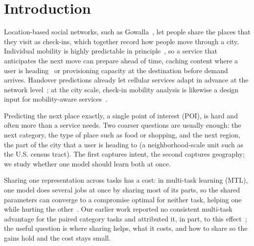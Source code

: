 \section{Introduction}
\label{sec:intro}

Location-based social networks, such as Gowalla~\cite{cho2011gowalla}, let people share the places that they visit as check-ins, which together record how people move through a city. Individual mobility is highly predictable in principle~\cite{song2010limits}, so a service that anticipates the next move can prepare ahead of time, caching content where a user is heading~\cite{bastug2014edge} or provisioning capacity at the destination before demand arrives. Handover predictions already let cellular services adapt in advance at the network level~\cite{vielhaus2022handover}; at the city scale, check-in mobility analysis is likewise a design input for mobility-aware services~\cite{moura2025mobilityaware}.

Predicting the next place exactly, a single point of interest (POI), is hard and often more than a service needs. Two coarser questions are usually enough: the next category, the type of place such as food or shopping, and the next region, the part of the city that a user is heading to (a neighborhood-scale unit such as the U.S. census tract). The first captures intent, the second captures geography; we study whether one model should learn both at once.

Sharing one representation across tasks has a cost: in multi-task learning (MTL), one model does several jobs at once by sharing most of its parts, so the shared parameters can converge to a compromise optimal for neither task, helping one while hurting the other~\cite{caruana1997multitask}. Our earlier
work reported no consistent multi-task advantage for the paired category tasks and attributed it, in part, to this effect~\cite{silva2025mtlnet}; the useful question is where sharing helps, what it costs, and how to share so the gains hold and the cost stays small.

